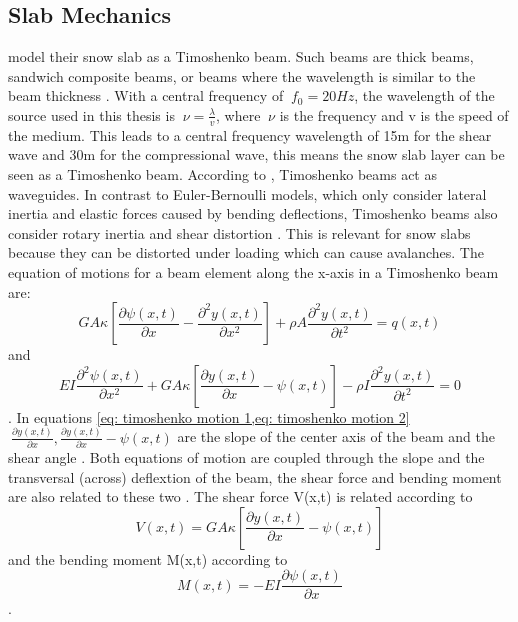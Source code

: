 \documentclass[10pt]{article}
\begin{document}
\subsection{Slab Mechanics}
\cite{sironTheoreticalFrameworkDynamic2023} model their snow slab as a Timoshenko beam. Such beams are thick beams, sandwich composite beams, or beams where the wavelength is similar to the beam thickness \parencite{sironTheoreticalFrameworkDynamic2023}. With a central frequency of $\ f_0 = 20 Hz$, the wavelength of the source used in this thesis is $\ \nu = \frac{\lambda}{v}$, where $\ \nu$ is the frequency and v is the speed of the medium. This leads to a central frequency wavelength of 15m for the shear wave and 30m for the compressional wave, this means the snow slab layer can be seen as a Timoshenko beam. According to \cite{meiWaveReflectionTransmission2004}, Timoshenko beams act as waveguides. In contrast to Euler-Bernoulli models, which only consider lateral inertia and elastic forces caused by bending deflections, Timoshenko beams also consider rotary inertia and shear distortion \parencite{meiWaveReflectionTransmission2004}. This is relevant for snow slabs because they can be distorted under loading which can cause avalanches. The equation of motions for a beam element along the x-axis in a Timoshenko beam are: \begin{equation}
  GA\kappa [\frac{\partial \psi (x,t)}{\partial x} - \frac{\partial^2 y (x,t)}{\partial x^2}] + \rho A \frac{\partial^2 y(x,t)}{\partial t^2} = q(x,t)
  \label{eq: timoshenko motion 1}
\end{equation} and \begin{equation}
  EI \frac{\partial^2 \psi (x,t)}{\partial x^2} + GA\kappa [\frac{\partial y (x,t)}{\partial x} - \psi(x,t)] - \rho I \frac{\partial^2y(x,t)}{\partial t^2} = 0
  \label{eq: timoshenko motion 2}
\end{equation} \parencite{meiWaveReflectionTransmission2004}. In equations \ref{eq: timoshenko motion 1,eq: timoshenko motion 2} $\ \frac{\partial y (x,t)}{\partial x},  \frac{\partial y (x,t)}{\partial x} - \psi(x,t)$ are the slope of the center axis of the beam and the shear angle \parencite{meiWaveReflectionTransmission2004}. Both equations of motion are coupled through the slope and the transversal (across) deflextion of the beam, the shear force and bending moment are also related to these two \parencite{meiWaveReflectionTransmission2004}. The shear force V(x,t) is related according to \begin{equation}
  V(x,t) = GA\kappa [\frac{\partial y (x,t)}{\partial x} - \psi(x,t)]
  \label{eq:timoshenko shear}
\end{equation} and the bending moment M(x,t) according to \begin{equation}
  M(x,t) = -EI\frac{\partial\psi(x,t)}{\partial x}
  \label{eq:timoshenko bending}
\end{equation} \parencite{meiWaveReflectionTransmission2004}. \par
\end{document}
